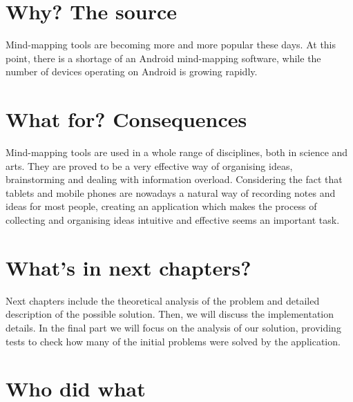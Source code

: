\section{Why? The source}
\label{sec:why}

Mind-mapping tools are becoming more and more popular these days. At this point, there is a shortage of an Android mind-mapping software, while the number of devices operating on Android is growing rapidly.

\section{What for? Consequences}
\label{sec:whatfor}

Mind-mapping tools are used in a whole range of disciplines, both in science and arts. They are proved to be a very effective way of organising ideas, brainstorming and dealing with information overload. Considering the fact that tablets and mobile phones are nowadays a natural way of recording notes and ideas for most people, creating an application which makes the process of collecting and organising ideas intuitive and effective seems an important task.

\section{What's in next chapters?}
\label{sec:nextchapters}

Next chapters include the theoretical analysis of the problem and detailed description of the possible solution. Then, we will discuss the implementation details. In the final part we will focus on the analysis of our solution, providing tests to check how many of the initial problems were solved by the application.

\section{Who did what}
\label{sec:who-did-what}

